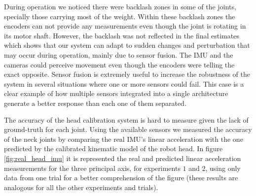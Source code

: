During operation we noticed there were backlash zones in some of the joints, specially those carrying most of the weight. Within these backlash zones the encoders can not provide any measurements even though the joint is rotating in its motor shaft. However, the backlash was not reflected in the final estimates which shows that our system can adapt to sudden changes and perturbation that may occur during operation, mainly due to sensor fusion. The IMU and the cameras could perceive movement even though the encoders were telling the exact opposite. Sensor fusion is extremely useful to increase the robustness of the system in several situations where one or more sensors could fail. This case is a clear example of how multiple sensors integrated into a single architecture generate a better response than each one of them separated.

The accuracy of the head calibration system is hard to measure given the lack of ground-truth for each joint. Using the available sensors we measured the accuracy of the neck joints by comparing the real IMU's linear acceleration with the one predicted by the calibrated kinematic model of the robot head. In figure \ref{fig:real_head_imu} it is represented the real and predicted linear acceleration measurements for the three principal axis, for experiments $1$ and $2$, using only data from one trial for a better comprehension of the figure (these results are analogous for all the other experiments and trials).

